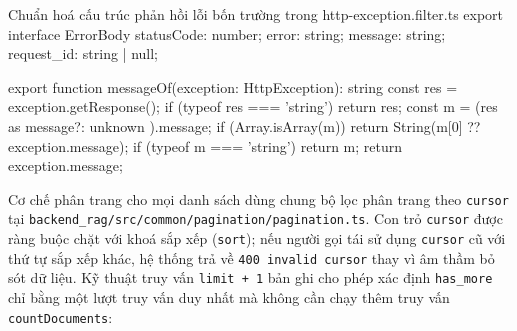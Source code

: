 \begin{tsbox}{Chuẩn hoá cấu trúc phản hồi lỗi bốn trường trong http-exception.filter.ts}
export interface ErrorBody {
  statusCode: number;
  error: string;
  message: string;
  request_id: string | null;
}

export function messageOf(exception: HttpException): string {
  const res = exception.getResponse();
  if (typeof res === 'string') return res;
  const m = (res as { message?: unknown }).message;
  if (Array.isArray(m)) return String(m[0] ?? exception.message);
  if (typeof m === 'string') return m;
  return exception.message;
}
\end{tsbox}

Cơ chế phân trang cho mọi danh sách dùng chung bộ lọc phân trang theo \texttt{cursor} tại \texttt{backend\_\allowbreak{}rag/\allowbreak{}src/\allowbreak{}common/\allowbreak{}pagination/\allowbreak{}pagination.\allowbreak{}ts}. Con trỏ \texttt{cursor} được ràng buộc chặt với khoá sắp xếp (\texttt{sort}); nếu người gọi tái sử dụng \texttt{cursor} cũ với thứ tự sắp xếp khác, hệ thống trả về \texttt{400 invalid cursor} thay vì âm thầm bỏ sót dữ liệu. Kỹ thuật truy vấn \texttt{limit + 1} bản ghi cho phép xác định \texttt{has\_more} chỉ bằng một lượt truy vấn duy nhất mà không cần chạy thêm truy vấn \texttt{countDocuments}:

